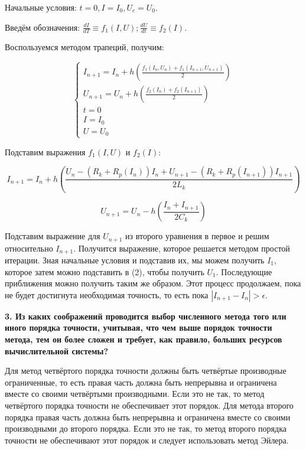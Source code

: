 Начальные условия: $t=0,I=I_0,U_c=U_0$.

Введём обозначения: $\frac{dI}{dT}\equiv f_1 (I,U);  \frac{dU}{dt}\equiv f_2 (I)$. 

Воспользуемся методом трапеций, получим:

\begin{equation*}
    \begin{cases}
        I_{n+1} = I_n + h(\frac{f_1(I_n,U_n) + f_1(I_{n+1}, U_{n+1})}{2})\\
        U_{n+1} = U_n + h(\frac{f_2(I_n) + f_2(I_{n+1})}{2})\\
        t = 0\\
        I = I_0\\
        U = U_0
    \end{cases}
\end{equation*}

Подставим выражения $f_1(I,U)$ и $f_2(I)$:

\begin{equation*}
    I_{n+1} = I_n + h(\frac{U_n - (R_k + R_p(I_n))I_n + U_{n+1} - (R_k + R_p(I_{n+1}))I_{n+1}}{2 L_k })
\end{equation*}

\begin{equation*}
    U_{n+1} = U_n - h(\frac{I_n + I_{n+1}}{2C_k})
\end{equation*}

Подставим выражение для $U_{n+1}$ из второго уравнения в первое и решим относительно $I_{n+1}$. Получится выражение, которое решается методом простой итерации. Зная начальные условия и подставив их, мы можем получить $I_1$, которое затем можно подставить в (2), чтобы получить $U_1$. Последующие приближения можно получить таким же образом. Этот процесс продолжаем, пока не будет достигнута необходимая точность, то есть пока $|I_{n+1}-I_n |>\epsilon$.

\newpage

\hspace{0cm} \textbf{3. Из каких соображений проводится выбор численного метода того или иного порядка точности, учитывая, что чем выше порядок точности метода, тем он более сложен и требует, как правило, больших ресурсов вычислительной системы?}

Для метод четвёртого порядка точности должны быть четвёртые производные ограниченные, то есть правая часть должна быть непрерывна и ограничена вместе со своими четвёртыми производными. Если это не так, то метод четвёртого порядка точности не обеспечивает этот порядок.
Для метода второго порядка правая часть должна быть непрерывна и ограничена вместе со своими производными до второго порядка. Если это не так, то метод второго порядка точности не обеспечивают этот порядок и следует использовать метод Эйлера.

